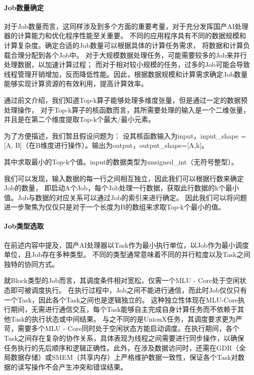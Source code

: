         
        
        \paragraph{Job数量确定}
        对于Job数量而言，这同样涉及到多个方面的重要考量，对于充分发挥国产AI处理器的计算能力和优化程序性能至关重要。
        不同的应用程序具有不同的数据规模和计算复杂度。确定合适的Job数量可以根据具体的计算任务需求，
        将数据和计算负载合理分配到各个Job中。
        对于大规模数据处理任务，可能需要较多的Job来并行处理数据，以加速计算过程；
        而对于相对较小规模的任务，过多的Job可能会导致线程管理开销增加，反而降低性能。因此，根据数据规模和计算需求确定Job数量能够实现计算资源的有效利用，提高计算效率。


        通过前文介绍，我们知道Top-k算子能够处理多维度张量，但是通过一定的数据预处理操作，
        对于Top-k算子的核函数而言，其所需要处理的输入是一个二维张量，并且是在第二个维度提取Top-k个最大/最小元素。
        
        为了方便描述，我们暂且假设问题为：
        设其核函数输入为input，input\_shape = [A, B]（在B维度进行操作）。输出为output，output\_shape=[A,k]。

        其中求取最小的Top-k个值。input的数据类型为unsigned\_int（无符号整型）。
        
        我们可以发现，输入数据的每一行之间相互独立，因此我们可以根据行数来确定Job的数量，
        即启动A个Job，每个Job处理一行数据，获取此行数据的k个最小值。Job与数据的对应关系可以通过Job的索引来进行确定。
        因此我们可以将问题进一步聚焦为仅仅只是对于一个长度为B的数组来求取Top-k个最小的值。

        
        \paragraph{Job类型选取}
        在前述内容中提及，国产AI处理器以Task作为最小执行单位，以Job作为最小调度单位，且Job存在多种类型。
        不同的类型通常意味着不同的并行粒度以及Task之间独特的协同方式。

        就Block类型的Job而言，其调度条件相对宽松，仅需一个MLU - Core处于空闲状态即可被调度执行。
        在执行过程中，Job之间不能进行通信，而此时Job仅仅只有一个Task，因此各个Task之间也是逻辑独立的。
        这种独立性体现在MLU-Core执行期间，无需进行通信交互，每个Task能够自主完成自身计算任务而不依赖于其他Task的执行状态或中间结果。
        与之不同的是UnionX任务，其调度要求更为严苛，需要多个MLU - Core同时处于空闲状态方能启动调度。在执行期间，各个Task之间存在复杂的协作关系，具体表现为线程之间需要进行同步操作，以确保任务执行的先后顺序和逻辑正确性。此外，在涉及数据访问时，还需在GDR（全局数据存储）或SMEM（共享内存）上严格维护数据一致性，保证各个Task对数据的读写操作不会产生冲突和错误结果。
        
